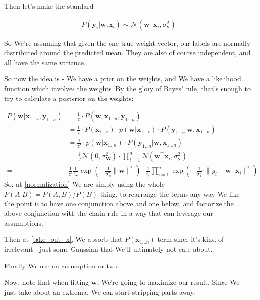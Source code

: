 \documentclass{article}
\begin{document}
		Then let's make the standard 
		
		\begin{align}
			P(\mathbf{y}_i | \mathbf{w}, \mathbf{x}_i) \sim\mathcal{N}(\mathbf{w}^\top\mathbf{x}_i, \sigma^2_{\mathbf{y}})
		\end{align}
		
		So We're assuming that given the one true weight vector, our labels are normally distributed around the predicted mean. They are also of course independent, and all have the same variance. 
		
		So now the idea is - We have a prior on the weights, and We have a likelihood function which involves the weights. By the glory of Bayes' rule, that's enough to try to calculate a posterior on the weights:
		
		\begin{align}
			P(\mathbf{w}|\mathbf{x}_{1\ldots n}, \mathbf{y}_{1\ldots n}) &= \frac{1}{z}\cdot P(\mathbf{w}, \mathbf{x}_{1\ldots n}, \mathbf{y}_{1\ldots n})\label{normalization}\\
			 &= \frac{1}{z}\cdot P(\mathbf{x}_{1\ldots n})\cdot p(\mathbf{w}|\mathbf{x}_{1\ldots n})\cdot P(\mathbf{y}_{1\ldots n}|\mathbf{w}, \mathbf{x}_{1\ldots n})\\
			&= \frac{1}{z'}\cdot p(\mathbf{w}|\mathbf{x}_{1\ldots n})\cdot P(\mathbf{y}_{1\ldots n}|\mathbf{w}, \mathbf{x}_{1\ldots n})\label{take_out_x}\\
			&= \frac{1}{z'} \mathcal{N}(0, \sigma^2_{\mathbf{W}}) \cdot \prod^n_{i=1} \mathcal{N}(\mathbf{w}^\top\mathbf{x}_i, \sigma^2_{\mathbf{y}})\\
			=& \frac{1}{z'} \frac{1}{z_{\mathbf{w}}}\exp\left(-\frac{1}{\sigma^2_{\mathbf{w}}}\|\mathbf{w}\|^2 \right) \cdot \frac{1}{z_{\mathbf{y}}}\prod^n_{i=1} \exp\left(-\frac{1}{\sigma^2_{\mathbf{y}}}\cdot\|y_i - \mathbf{w}^\top\mathbf{x}_i \|^2\right)
		\end{align}
			So, at \ref{normalization} We are simply using the whole $P(A|B) = P(A, B)/P(B)$ thing, to rearrange the terms any way We like - the point is to have one conjunction above and one below, and factorize the above conjunction with the chain rule in a way that can leverage our assumptions.
			
			Then at \ref{take_out_x}, We absorb that $P(\mathbf{x}_{1\ldots n})$ term since it's kind of irrelevant - just some Gaussian that We'll ultimately not care about. 
			
			Finally We use an assumption or two. 
			
			Now, note that when fitting $\mathbf{w}$, We're going to maximize our result. Since We just take about an extrema, We can start stripping parts away:
			
\end{document}
